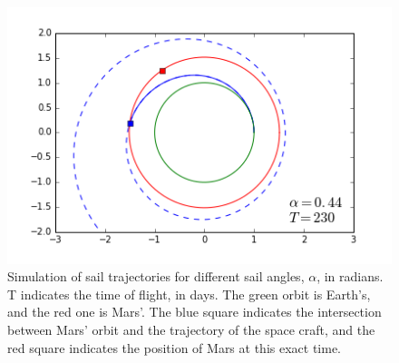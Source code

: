 \documentclass[twocolumn,12pt,a4paper]{article}
\numberwithin{equation}{section}
\begin{document}
\begin{figure}
	\includegraphics[scale=0.5]{simulacio4.png}
	\caption{Simulation of sail trajectories for different sail angles, $\alpha$, in radians. T indicates the time of flight, in days. The green orbit is Earth's, and the red one is Mars'. The blue square indicates the intersection between Mars' orbit and the trajectory of the space craft, and the red square indicates the position of Mars at this exact time. }
	\label{fig:espirals}
\end{figure}

\clearpage


\end{document}
